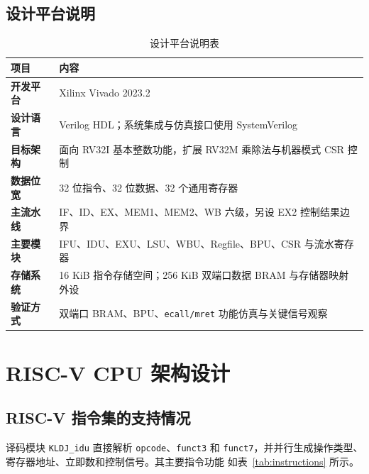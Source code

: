 \documentclass[UTF8,zihao=-4,a4paper]{ctexart}
\numberwithin{table}{section}
\numberwithin{figure}{section}
\newcommand{\code}[1]{\texttt{#1}}
\begin{document}
\subsection{设计平台说明}

\begin{table}[H]
  \centering
  \caption{设计平台说明表}
  \label{tab:overview}
  \begin{tabularx}{\textwidth}{>{\bfseries}p{3.5cm}X}
    \toprule
    项目 & 内容 \\
    \midrule
    开发平台 & Xilinx Vivado 2023.2 \\
    设计语言 & Verilog HDL；系统集成与仿真接口使用 SystemVerilog \\
    目标架构 & 面向 RV32I 基本整数功能，扩展 RV32M 乘除法与机器模式 CSR 控制 \\
    数据位宽 & 32 位指令、32 位数据、32 个通用寄存器 \\
    主流水线 & IF、ID、EX、MEM1、MEM2、WB 六级，另设 EX2 控制结果边界 \\
    主要模块 & IFU、IDU、EXU、LSU、WBU、Regfile、BPU、CSR 与流水寄存器 \\
    存储系统 & 16 KiB 指令存储空间；256 KiB 双端口数据 BRAM 与存储器映射外设 \\
    验证方式 & 双端口 BRAM、BPU、\code{ecall/mret} 功能仿真与关键信号观察 \\
    \bottomrule
  \end{tabularx}
\end{table}

\section{RISC-V CPU 架构设计}

\subsection{RISC-V 指令集的支持情况}

译码模块 \code{KLDJ\_idu} 直接解析 \code{opcode}、\code{funct3} 和
\code{funct7}，并并行生成操作类型、寄存器地址、立即数和控制信号。其主要指令功能
如表~\ref{tab:instructions} 所示。
\end{document}
